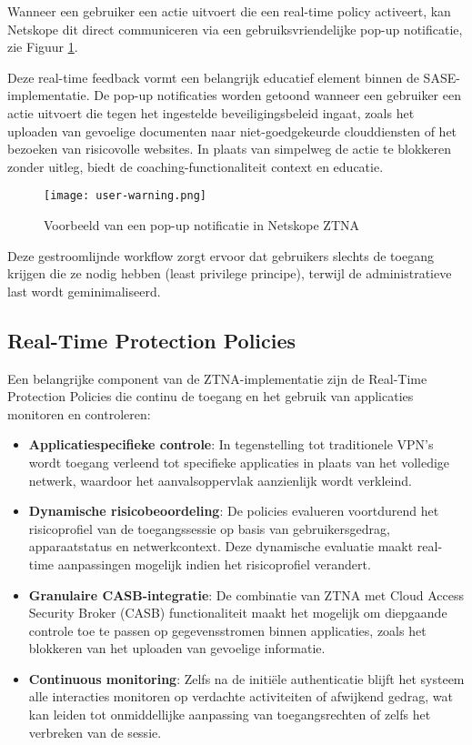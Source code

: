 Wanneer een gebruiker een actie uitvoert die een real-time policy activeert, kan Netskope dit direct communiceren via een gebruiksvriendelijke pop-up notificatie, zie Figuur \ref{fig:user-alert}. 

\vspace{2ex}

Deze real-time feedback vormt een belangrijk educatief element binnen de SASE-implementatie.
De pop-up notificaties worden getoond wanneer een gebruiker een actie uitvoert die tegen het ingestelde beveiligingsbeleid ingaat, zoals het uploaden van gevoelige documenten naar niet-goedgekeurde clouddiensten of het bezoeken van risicovolle websites. In plaats van simpelweg de actie te blokkeren zonder uitleg, biedt de coaching-functionaliteit context en educatie.
\begin{figure}[h!]
    \centering
    \texttt{[image: user-warning.png]}
    \caption[Netskope ZTNA pop-up notificatie]{Voorbeeld van een pop-up notificatie in Netskope ZTNA}
    \label{fig:user-alert}
\end{figure}

Deze gestroomlijnde workflow zorgt ervoor dat gebruikers slechts de toegang krijgen die ze nodig hebben (least privilege principe), terwijl de administratieve last wordt geminimaliseerd.

\subsection{Real-Time Protection Policies}

Een belangrijke component van de ZTNA-implementatie zijn de Real-Time Protection Policies die continu de toegang en het gebruik van applicaties monitoren en controleren:

\begin{itemize}
    \item \textbf{Applicatiespecifieke controle}: In tegenstelling tot traditionele VPN's wordt toegang verleend tot specifieke applicaties in plaats van het volledige netwerk, waardoor het aanvalsoppervlak aanzienlijk wordt verkleind.

    \item \textbf{Dynamische risicobeoordeling}: De policies evalueren voortdurend het risicoprofiel van de toegangssessie op basis van gebruikersgedrag, apparaatstatus en netwerkcontext. Deze dynamische evaluatie maakt real-time aanpassingen mogelijk indien het risicoprofiel verandert.

    \item \textbf{Granulaire CASB-integratie}: De combinatie van ZTNA met Cloud Access Security Broker (CASB) functionaliteit maakt het mogelijk om diepgaande controle toe te passen op gegevensstromen binnen applicaties, zoals het blokkeren van het uploaden van gevoelige informatie.

    \item \textbf{Continuous monitoring}: Zelfs na de initiële authenticatie blijft het systeem alle interacties monitoren op verdachte activiteiten of afwijkend gedrag, wat kan leiden tot onmiddellijke aanpassing van toegangsrechten of zelfs het verbreken van de sessie.
\end{itemize}

